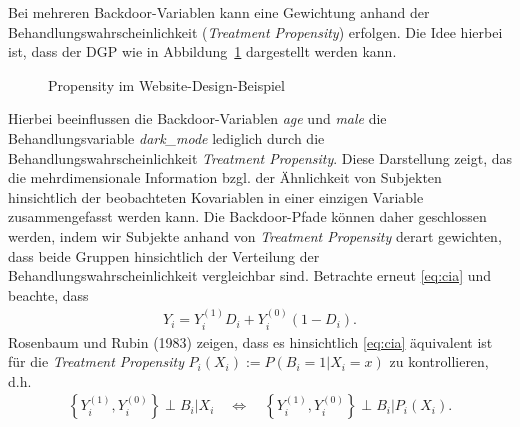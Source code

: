 \documentclass[
  a4paper,
  DIV=11,
  oneside]{scrreprt}
\begin{document}
Bei mehreren Backdoor-Variablen kann eine Gewichtung anhand der
Behandlungswahrscheinlichkeit (\emph{Treatment Propensity}) erfolgen.
Die Idee hierbei ist, dass der DGP wie in
Abbildung~\ref{fig-propCDdarkmode} dargestellt werden kann.

\begin{figure}[t]


\caption{\label{fig-propCDdarkmode}Propensity im
Website-Design-Beispiel}

\end{figure}%

Hierbei beeinflussen die Backdoor-Variablen \emph{age} und \emph{male}
die Behandlungsvariable \emph{dark\_mode} lediglich durch die
Behandlungswahrscheinlichkeit \emph{Treatment Propensity}. Diese
Darstellung zeigt, das die mehrdimensionale Information bzgl. der
Ähnlichkeit von Subjekten hinsichtlich der beobachteten Kovariablen in
einer einzigen Variable zusammengefasst werden kann. Die Backdoor-Pfade
können daher geschlossen werden, indem wir Subjekte anhand von
\emph{Treatment Propensity} derart gewichten, dass beide Gruppen
hinsichtlich der Verteilung der Behandlungswahrscheinlichkeit
vergleichbar sind. Betrachte erneut \eqref{eq:cia} und beachte, dass
\begin{align}
  Y_i = Y_i^{(1)} D_i + Y_i^{(0)} (1-D_i).
\end{align} Rosenbaum und Rubin (1983) zeigen, dass es hinsichtlich
\eqref{eq:cia} äquivalent ist für die \emph{Treatment Propensity}
\(P_i(X_i):=P(B_i=1\vert X_i = x)\) zu kontrollieren, d.h. \begin{align}
  \left\{Y_i^{(1)},Y_i^{(0)}\right\} \perp B_i\vert X_i \quad\Leftrightarrow\quad \left\{Y_i^{(1)},Y_i^{(0)}\right\} \perp B_i\vert P_i(X_i).
\end{align}
\end{document}
